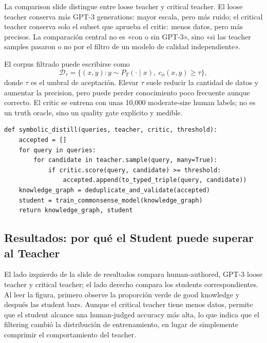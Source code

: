 La comparison slide distingue entre loose teacher y critical teacher. El loose teacher conserva más GPT-3 generations: mayor escala, pero más ruido; el critical teacher conserva solo el subset que aprueba el critic: menos datos, pero más precisos. La comparación central no es «con o sin GPT-3», sino «si las teacher samples pasaron o no por el filtro de un modelo de calidad independiente».


El corpus filtrado puede escribirse como
\begin{equation}
\mathcal{D}_{\tau}=\{(x,y):y\sim P_T(\cdot\mid x),\ c_{\phi}(x,y)\ge\tau\},
\end{equation}
donde $\tau$ es el umbral de aceptación. Elevar $\tau$ suele reducir la cantidad de datos y aumentar la precision, pero puede perder conocimiento poco frecuente aunque correcto. El critic se entrena con unas 10,000 moderate-size human labels; no es un truth oracle, sino un quality gate explícito y medible.

\begin{lstlisting}[caption={Flujo de datos y entrenamiento de Symbolic Knowledge Distillation}]
def symbolic_distill(queries, teacher, critic, threshold):
    accepted = []
    for query in queries:
        for candidate in teacher.sample(query, many=True):
            if critic.score(query, candidate) >= threshold:
                accepted.append(to_typed_triple(query, candidate))
    knowledge_graph = deduplicate_and_validate(accepted)
    student = train_commonsense_model(knowledge_graph)
    return knowledge_graph, student
\end{lstlisting}

\subsection{Resultados: por qué el Student puede superar al Teacher}

El lado izquierdo de la slide de resultados compara human-authored, GPT-3 loose teacher y critical teacher; el lado derecho compara los students correspondientes. Al leer la figura, primero observe la proporción verde de good knowledge y después las student bars. Aunque el critical teacher tiene menos datos, permite que el student alcance una human-judged accuracy más alta, lo que indica que el filtering cambió la distribución de entrenamiento, en lugar de simplemente comprimir el comportamiento del teacher.

